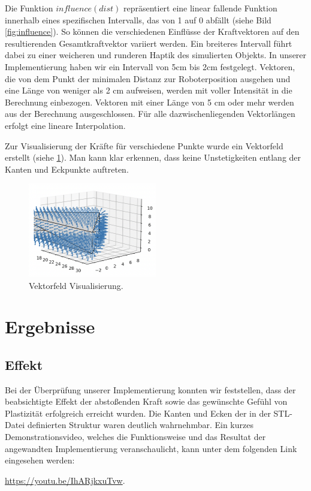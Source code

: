 \documentclass[conference]{IEEEtran}
\begin{document}
Die Funktion $influence(dist)$ repräsentiert eine linear fallende Funktion innerhalb eines spezifischen Intervalls, das von 1 auf 0 abfällt (siehe Bild \ref{fig:influence}). So können die verschiedenen Einflüsse der Kraftvektoren auf den resultierenden Gesamtkraftvektor variiert werden. Ein breiteres Intervall führt dabei zu einer weicheren und runderen Haptik des simulierten Objekts. In unserer Implementierung haben wir ein Intervall von 5cm bis 2cm festgelegt. Vektoren, die von dem Punkt der minimalen Distanz zur Roboterposition ausgehen und eine Länge von weniger als 2 cm aufweisen, werden mit voller Intensität in die Berechnung einbezogen. Vektoren mit einer Länge von 5 cm oder mehr werden aus der Berechnung ausgeschlossen. Für alle dazwischenliegenden Vektorlängen erfolgt eine lineare Interpolation.

Zur Visualisierung der Kräfte für verschiedene Punkte wurde ein Vektorfeld erstellt (siehe \ref{fig:vectorfield}). Man kann klar erkennen, dass keine Unstetigkeiten entlang der Kanten und Eckpunkte auftreten.
\begin{figure}[h]
    \centering
    \includegraphics[width=0.5\textwidth]{pics/vectorfield.png}
    \caption{Vektorfeld Visualisierung.}
    \label{fig:vectorfield}
\end{figure}
\section{Ergebnisse}
\subsection{Effekt}

Bei der Überprüfung unserer Implementierung konnten wir feststellen, dass der beabsichtigte Effekt der abstoßenden Kraft sowie das gewünschte Gefühl von Plastizität erfolgreich erreicht wurden. Die Kanten und Ecken der in der STL-Datei definierten Struktur waren deutlich wahrnehmbar. Ein kurzes Demonstrationsvideo, welches die Funktionsweise und das Resultat der angewandten Implementierung veranschaulicht, kann unter dem folgenden Link eingesehen werden:
\begin{minipage}{\textwidth}
    \nobreak\url{https://youtu.be/IhARjkxuTvw}.
\end{minipage}
\end{document}
